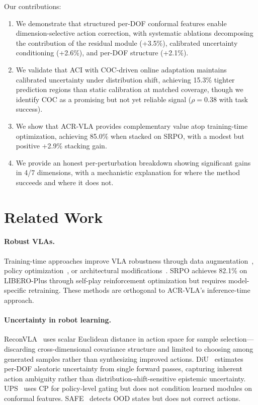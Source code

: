 \documentclass[letterpaper]{article}
\begin{document}
Our contributions:
\begin{enumerate}
    \item We demonstrate that structured per-DOF conformal features enable dimension-selective action correction, with systematic ablations decomposing the contribution of the residual module (+3.5\%), calibrated uncertainty conditioning (+2.6\%), and per-DOF structure (+2.1\%).
    \item We validate that ACI with COC-driven online adaptation maintains calibrated uncertainty under distribution shift, achieving 15.3\% tighter prediction regions than static calibration at matched coverage, though we identify COC as a promising but not yet reliable signal ($\rho{=}0.38$ with task success).
    \item We show that ACR-VLA provides complementary value atop training-time optimization, achieving 85.0\% when stacked on SRPO, with a modest but positive +2.9\% stacking gain.
    \item We provide an honest per-perturbation breakdown showing significant gains in 4/7 dimensions, with a mechanistic explanation for where the method succeeds and where it does not.
\end{enumerate}

\section{Related Work}
\label{sec:related}

\paragraph{Robust VLAs.}
Training-time approaches improve VLA robustness through data augmentation~\cite{robustvla}, policy optimization~\cite{srpo}, or architectural modifications~\cite{digflow}.
SRPO achieves 82.1\% on LIBERO-Plus through self-play reinforcement optimization but requires model-specific retraining.
These methods are orthogonal to ACR-VLA's inference-time approach.

\paragraph{Uncertainty in robot learning.}
ReconVLA~\cite{reconvla} uses scalar Euclidean distance in action space for sample selection---discarding cross-dimensional covariance structure and limited to choosing among generated samples rather than synthesizing improved actions.
DiU~\cite{diu} estimates per-DOF aleatoric uncertainty from single forward passes, capturing inherent action ambiguity rather than distribution-shift-sensitive epistemic uncertainty.
UPS~\cite{ups} uses CP for policy-level gating but does not condition learned modules on conformal features.
SAFE~\cite{safe} detects OOD states but does not correct actions.
\end{document}
